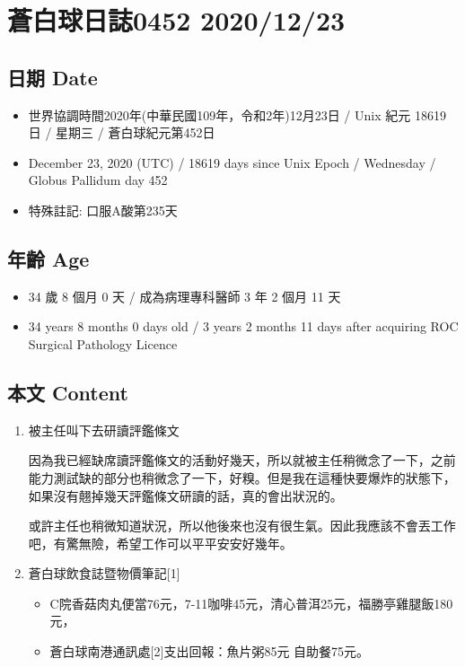 \documentclass[a5paper, 10pt
]{book}
\providecommand{\tightlist}{%
  \setlength{\itemsep}{0pt}\setlength{\parskip}{0pt}}
\begin{document}
\hypertarget{ux84bcux767dux7403ux65e5ux8a8c0452-20201223}{%
\section{蒼白球日誌0452
2020/12/23}\label{ux84bcux767dux7403ux65e5ux8a8c0452-20201223}}

\hypertarget{ux65e5ux671f-date-22}{%
\subsection{日期 Date}\label{ux65e5ux671f-date-22}}

\begin{itemize}
\tightlist
\item
  世界協調時間2020年(中華民國109年，令和2年)12月23日 / Unix 紀元 18619
  日 / 星期三 / 蒼白球紀元第452日
\item
  December 23, 2020 (UTC) / 18619 days since Unix Epoch / Wednesday /
  Globus Pallidum day 452
\item
  特殊註記: 口服A酸第235天
\end{itemize}

\hypertarget{ux5e74ux9f61-age-22}{%
\subsection{年齡 Age}\label{ux5e74ux9f61-age-22}}

\begin{itemize}
\tightlist
\item
  34 歲 8 個月 0 天 / 成為病理專科醫師 3 年 2 個月 11 天
\item
  34 years 8 months 0 days old / 3 years 2 months 11 days after
  acquiring ROC Surgical Pathology Licence
\end{itemize}

\hypertarget{ux672cux6587-content-22}{%
\subsection{本文 Content}\label{ux672cux6587-content-22}}

\begin{enumerate}
\def\labelenumi{\arabic{enumi}.}
\item
  被主任叫下去研讀評鑑條文

  因為我已經缺席讀評鑑條文的活動好幾天，所以就被主任稍微念了一下，之前能力測試缺的部分也稍微念了一下，好糗。但是我在這種快要爆炸的狀態下，如果沒有翹掉幾天評鑑條文研讀的話，真的會出狀況的。

  或許主任也稍微知道狀況，所以他後來也沒有很生氣。因此我應該不會丟工作吧，有驚無險，希望工作可以平平安安好幾年。
\item
  蒼白球飲食誌暨物價筆記{[}1{]}

  \begin{itemize}
  \tightlist
  \item
    C院香菇肉丸便當76元，7-11咖啡45元，清心普洱25元，福勝亭雞腿飯180元，
  \item
    蒼白球南港通訊處{[}2{]}支出回報：魚片粥85元 自助餐75元。
  \end{itemize}
\end{enumerate}
\end{document}
